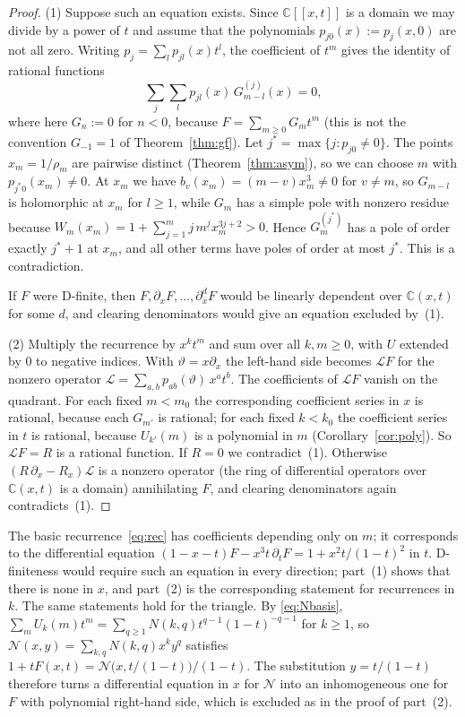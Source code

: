 \documentclass[11pt]{amsart}
\theoremstyle{definition}
\newcommand{\C}{\mathbb{C}}
\begin{document}
\begin{proof}
(1) Suppose such an equation exists. Since $\C[[x,t]]$ is a domain we may divide by a power of $t$ and assume that the polynomials $p_{j0}(x):=p_j(x,0)$ are not all zero. Writing $p_j=\sum_lp_{jl}(x)t^l$, the coefficient of $t^m$ gives the identity of rational functions
\[
  \sum_j\sum_lp_{jl}(x)\,G_{m-l}^{(j)}(x)=0,
\]
where here $G_n:=0$ for $n<0$, because $F=\sum_{m\ge0}G_mt^m$ (this is not the convention $G_{-1}=1$ of Theorem~\ref{thm:gf}).
Let $j^*=\max\{j:p_{j0}\ne0\}$. The points $x_m=1/\rho_m$ are pairwise distinct (Theorem~\ref{thm:asym}), so we can choose $m$ with $p_{j^*0}(x_m)\ne0$. At $x_m$ we have $b_v(x_m)=(m-v)x_m^3\ne0$ for $v\ne m$, so $G_{m-l}$ is holomorphic at $x_m$ for $l\ge1$, while $G_m$ has a simple pole with nonzero residue because $W_m(x_m)=1+\sum_{j=1}^{m}j\,m^{\underline j}x_m^{3j+2}>0$. Hence $G_m^{(j^*)}$ has a pole of order exactly $j^*+1$ at $x_m$, and all other terms have poles of order at most $j^*$. This is a contradiction.

If $F$ were D-finite, then $F,\partial_xF,\dots,\partial_x^dF$ would be linearly dependent over $\C(x,t)$ for some $d$, and clearing denominators would give an equation excluded by~(1).

(2) Multiply the recurrence by $x^kt^m$ and sum over all $k,m\ge0$, with $U$ extended by $0$ to negative indices. With $\vartheta=x\partial_x$ the left-hand side becomes $\mathcal LF$ for the nonzero operator $\mathcal L=\sum_{a,b}p_{ab}(\vartheta)\,x^at^b$. The coefficients of $\mathcal LF$ vanish on the quadrant. For each fixed $m<m_0$ the corresponding coefficient series in $x$ is rational, because each $G_{m'}$ is rational; for each fixed $k<k_0$ the coefficient series in $t$ is rational, because $U_{k'}(m)$ is a polynomial in $m$ (Corollary~\ref{cor:poly}). So $\mathcal LF=R$ is a rational function. If $R=0$ we contradict~(1). Otherwise $(R\,\partial_x-R_x)\mathcal L$ is a nonzero operator (the ring of differential operators over $\C(x,t)$ is a domain) annihilating $F$, and clearing denominators again contradicts~(1).
\end{proof}

The basic recurrence~\eqref{eq:rec} has coefficients depending only on $m$; it corresponds to the differential equation $(1-x-t)F-x^3t\,\partial_tF=1+x^2t/(1-t)^2$ in $t$. D-finiteness would require such an equation in every direction; part~(1) shows that there is none in $x$, and part~(2) is the corresponding statement for recurrences in $k$. The same statements hold for the triangle. By \eqref{eq:Nbasis}, $\sum_mU_k(m)t^m=\sum_{q\ge1}N(k,q)t^{q-1}(1-t)^{-q-1}$ for $k\ge1$, so $\mathcal N(x,y)=\sum_{k,q}N(k,q)x^ky^q$ satisfies $1+tF(x,t)=\mathcal N\bigl(x,t/(1-t)\bigr)/(1-t)$. The substitution $y=t/(1-t)$ therefore turns a differential equation in $x$ for $\mathcal N$ into an inhomogeneous one for $F$ with polynomial right-hand side, which is excluded as in the proof of part~(2).
\end{document}
